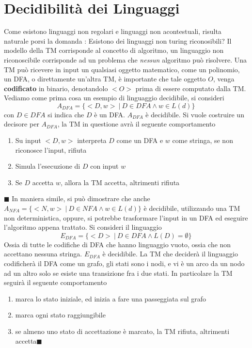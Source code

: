 \documentclass[10pt, letterpaper]{report}
\begin{document}
\section{Decidibilità dei Linguaggi}
Come esistono linguaggi non regolari e linguaggi non acontestuali, risulta naturale porsi la domanda : Esistono dei linguaggi non turing riconosibili? Il modello della TM corrisponde al concetto di algoritmo, un linguaggio non riconoscibile corrisponde ad un problema che \textit{nessun} algoritmo può risolvere.\acc 
Una TM può ricevere in input un qualsiasi oggetto matematico, come un polinomio, un DFA, o direttamente un'altra TM, è importante che tale oggetto $O$, venga \textbf{codificato} in binario, denotandolo $<O>$ prima di essere computato dalla TM.\acc 
Vediamo come prima cosa un esempio di linguaggio decidibile, si consideri 
$$A_{DFA}=\{<D,w>\ |\ D \in DFA \land w\in L(d)\}$$
con $D\in DFA$ si indica che $D$ è un DFA. \acc 
\prop{} $A_{DFA}$ è decidibile. \acc 
\dimo{} Si vuole costruire un decisore per $A_{DFA}$, la TM in questione avrà il seguente comportamento\begin{enumerate}
    \item Su input $<D,w>$ interpreta $D$ come un DFA e $w$ come stringa, se non riconosce l'input, rifiuta 
    \item Simula l'esecuzione di $D$ con input $w$
    \item Se $D$ accetta $w$, allora la TM accetta, altrimenti rifiuta
\end{enumerate}
\hfill $\blacksquare$\acc 
In maniera simile, si può dimostrare che anche  $A_{NFA}=\{<N,w>\ |\ D \in NFA \land w\in L(d)\}$ è decidibile, utilizzando una TM non deterministica, oppure, si potrebbe trasformare l'input in un DFA ed eseguire l'algoritmo appena trattato. \acc  
Si consideri il linguaggio 
$$ E_{DFA}=\{<D>\ | \ D\in DFA \land L(D)=\emptyset\}$$
Ossia di tutte le codifiche di DFA che hanno linguaggio vuoto, ossia che non accettano nessuna stringa. \acc 
\prop{} $E_{DFA}$ è decidibile. \acc 
\dimo{} La TM che deciderà il linguaggio codificherà il DFA come un grafo,  gli stati sono i nodi, e vi è un arco da un nodo ad un altro solo se esiste una transizione fra i due stati. In particolare la TM seguirà il seguente comportamento\begin{enumerate}
    \item marca lo stato iniziale, ed inizia a fare una passeggiata sul grafo 
    \item marca ogni stato raggiungibile 
    \item se almeno uno stato di accettazione è marcato, la TM rifiuta, altrimenti accetta\hfill $\blacksquare$
\end{enumerate}
\end{document}
